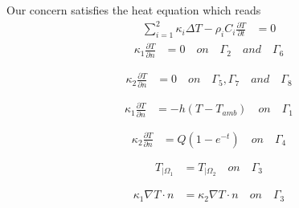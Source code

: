 Our concern satisfies the heat equation which reads 
\begin{equation}
\label{heat:eq}
   \begin{split}
      \displaystyle{\sum_{i=1}^{2} \kappa_i \Delta T - \rho_i C_i \frac{ \partial T}{\partial t}}  & = 0
  \end{split}
\end{equation}
\begin{equation}
\label{hom_neu1}
   \begin{split}
      \displaystyle{ \kappa_1 \frac{\partial T}{\partial n}} & =  0 \quad on \quad \Gamma_2 \quad and \quad \Gamma_6 \\ \\ 
  \end{split}
\end{equation}
\begin{equation}
\label{hom_neu2}
   \begin{split}
      \displaystyle{ \kappa_2 \frac{\partial T}{\partial n}} & =  0 \quad on \quad \Gamma_5 , \Gamma_7 \quad and \quad \Gamma_8 \\ \\ 
  \end{split}
\end{equation}
\begin{equation}
\label{classic_neu}
   \begin{split}
      \displaystyle{ \kappa_1 \frac{\partial T}{\partial n}} & = - h( T - T_{amb}) \quad on \quad \Gamma_1 \\ \\
  \end{split}
\end{equation}
\begin{equation}
\label{nonhom_neu}
   \begin{split}
      \displaystyle{ \kappa_2 \frac{\partial T}{\partial n}} & =  Q(1-e^{-t}) \quad on \quad \Gamma_4 \\ \\
  \end{split}
\end{equation}
\begin{equation}
\label{temp_conti}
   \begin{split}
      T_{| \varOmega_1} & = T_{| \varOmega_2} \quad on \quad \Gamma_3 \\ \\
  \end{split}
\end{equation}
\begin{equation}
\label{flux_conti}
   \begin{split}
      \displaystyle{ \kappa_1 \nabla T \cdot n} & = \displaystyle{ \kappa_2 \nabla T \cdot n \quad on \quad \Gamma_3} \\ \\
  \end{split}
\end{equation}

